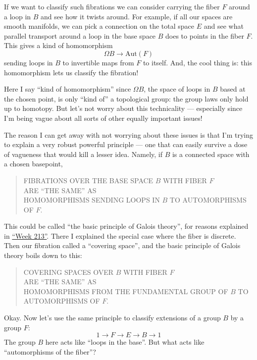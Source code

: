 \documentclass{article}
\begin{document}
If we want to classify such fibrations we can consider carrying the
fiber \(F\) around a loop in \(B\) and see how it twists around. For
example, if all our spaces are smooth manifolds, we can pick a
connection on the total space \(E\) and see what parallel transport
around a loop in the base space \(B\) does to points in the fiber \(F\).
This gives a kind of homomorphism \[\Omega B \to \mathrm{Aut}(F)\]
sending loops in \(B\) to invertible maps from \(F\) to itself. And, the
cool thing is: this homomorphism lets us classify the fibration!

Here I say ``kind of homomorphism'' since \(\Omega B\), the space of
loops in \(B\) based at the chosen point, is only ``kind of'' a
topological group: the group laws only hold up to homotopy. But let's
not worry about this technicality --- especially since I'm being vague
about all sorts of other equally important issues!

The reason I can get away with not worrying about these issues is that
I'm trying to explain a very robust powerful principle --- one that can
easily survive a dose of vagueness that would kill a lesser idea.
Namely, if \(B\) is a connected space with a chosen basepoint,

\begin{quote}
FIBRATIONS OVER THE BASE SPACE \(B\) WITH FIBER \(F\)\\
ARE ``THE SAME'' AS\\
HOMOMORPHISMS SENDING LOOPS IN \(B\) TO AUTOMORPHISMS OF \(F\).
\end{quote}

This could be called ``the basic principle of Galois theory'', for
reasons explained in \protect\hyperlink{week213}{``Week 213''}. There I
explained the special case where the fiber is discrete. Then our
fibration called a ``covering space'', and the basic principle of Galois
theory boils down to this:

\begin{quote}
COVERING SPACES OVER \(B\) WITH FIBER \(F\)\\
ARE ``THE SAME'' AS\\
HOMOMORPHISMS FROM THE FUNDAMENTAL GROUP OF \(B\) TO AUTOMORPHISMS OF
\(F\).
\end{quote}

Okay. Now let's use the same principle to classify extensions of a group
\(B\) by a group \(F\): \[1 \to F \to E \to B \to 1\] The group \(B\)
here acts like ``loops in the base''. But what acts like ``automorphisms
of the fiber''?
\end{document}
